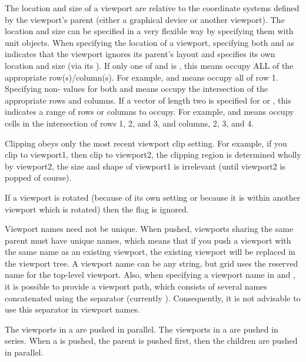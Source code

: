 %
\begin{Details}\relax
The location and size of a viewport are relative to the coordinate
systems defined by the viewport's parent (either a graphical device
or another viewport).  The location and size can be specified in a
very flexible way by specifying them with unit objects.
When specifying the location of a viewport, specifying
both  and  as 
indicates that
the viewport ignores its parent's layout and specifies its own
location and size (via its ).  If only one of
 and  is , this
means occupy ALL of the appropriate row(s)/column(s).  For example,
 and  means
occupy all of row 1.  Specifying non- values for both
 and  means occupy the
intersection of the appropriate rows and columns.  If a vector of
length two is
specified for  or , this
indicates a range of rows or columns to occupy.  For example,
 and 
means occupy cells in the intersection of rows 1, 2, and 3, and
columns, 2, 3, and 4.

Clipping obeys only the most recent viewport clip setting.
For example, if you clip to viewport1, then clip to viewport2,
the clipping region is determined wholly by viewport2, the
size and shape of viewport1 is irrelevant (until viewport2
is popped of course).

If a viewport is rotated (because of its own  setting
or because it is within another viewport which is rotated) then
the  flag is ignored.

Viewport names need not be unique.  When pushed, viewports
sharing the same parent must have unique names, which means that
if you push a viewport with the same name as an existing viewport,
the existing viewport will be replaced in the viewport tree.
A viewport name can be any string, but
grid uses the
reserved name  for the top-level viewport.  Also,
when specifying a viewport name in 
and , it is possible to provide a viewport
path, which consists of several names concatenated using the
separator  (currently \code{::}).  Consequently, it is not
advisable to use this separator in viewport names.

The viewports in a  are pushed in parallel.  The
viewports in a  are pushed in series.  When a
 is pushed, the parent is pushed first, then the
children are pushed in parallel.
\end{Details}
